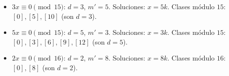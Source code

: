 \begin{ejemplo}
\begin{itemize}
    \item $3x\equiv 0 \pmod{15}$: $d=3$, $m'=5$. Soluciones: $x=5k$. Clases
    módulo $15$: $[0],[5],[10]$ (son $d=3$).
    \item $5x\equiv 0 \pmod{15}$: $d=5$, $m'=3$. Soluciones: $x=3k$. Clases
    módulo $15$: $[0],[3],[6],[9],[12]$ (son $d=5$).
    \item $2x\equiv 0 \pmod{16}$: $d=2$, $m'=8$. Soluciones: $x=8k$. Clases
    módulo $16$: $[0],[8]$ (son $d=2$).
\end{itemize}
\end{ejemplo}
